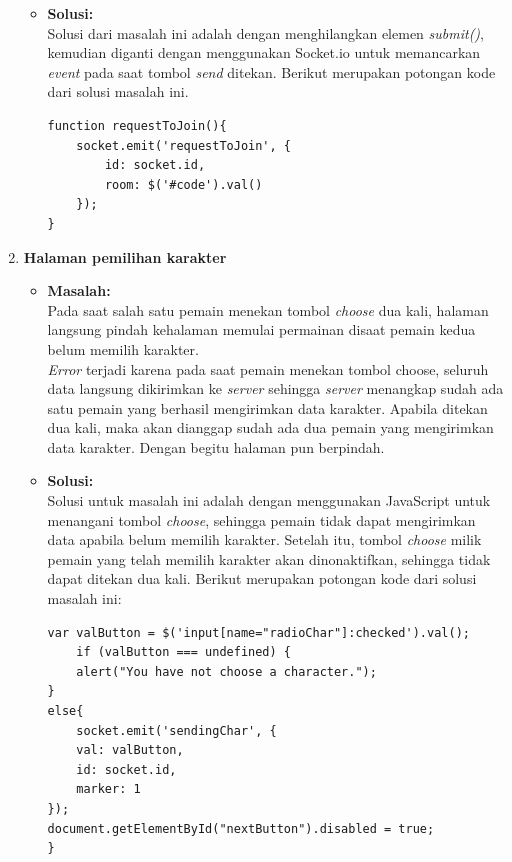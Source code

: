 \begin{enumerate}
\begin{itemize}
		\item \textbf{Solusi:} \\
		Solusi dari masalah ini adalah dengan menghilangkan elemen \textit{submit()}, kemudian diganti dengan menggunakan Socket.io untuk memancarkan \textit{event} pada saat tombol \textit{send} ditekan. Berikut merupakan potongan kode dari solusi masalah ini.
		
\begin{lstlisting}[caption={Proses memancarkan \textit{event}}, label={lst:emitEvent}, captionpos=b]
function requestToJoin(){
	socket.emit('requestToJoin', {
		id: socket.id,
		room: $('#code').val()
	});
}
\end{lstlisting}	
	\end{itemize}
	
	\item \textbf{Halaman pemilihan karakter}
	\begin{itemize}
		\item \textbf{Masalah:} \\
		Pada saat salah satu pemain menekan tombol \textit{choose} dua kali, halaman langsung pindah kehalaman memulai permainan disaat pemain kedua belum memilih karakter. \\
		
		\textit{Error} terjadi karena pada saat pemain menekan tombol choose, seluruh data langsung dikirimkan ke \textit{server} sehingga \textit{server} menangkap sudah ada satu pemain yang berhasil mengirimkan data karakter. Apabila ditekan dua kali, maka akan dianggap sudah ada dua pemain yang mengirimkan data karakter. Dengan begitu halaman pun berpindah.
		
		\item \textbf{Solusi:} \\
		Solusi untuk masalah ini adalah dengan menggunakan JavaScript untuk menangani tombol \textit{choose}, sehingga pemain tidak dapat mengirimkan data apabila belum memilih karakter. Setelah itu, tombol \textit{choose}  milik pemain yang telah memilih karakter akan dinonaktifkan, sehingga tidak dapat ditekan dua kali. Berikut merupakan potongan kode dari solusi masalah ini:
		
\begin{lstlisting}[caption={Proses menangani tombol \textit{choose}}, label={lst:tombolChoose},captionpos=b]
var valButton = $('input[name="radioChar"]:checked').val();
	if (valButton === undefined) {
	alert("You have not choose a character.");
}
else{
	socket.emit('sendingChar', {
	val: valButton,
	id: socket.id,
	marker: 1
});
document.getElementById("nextButton").disabled = true;
}
\end{lstlisting}
	\end{itemize}


\end{enumerate}
